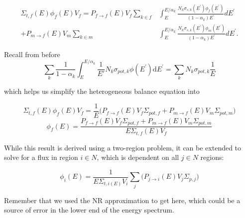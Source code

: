 \documentclass{beamer}
\begin{document}
\begin{frame}
\begin{align*}\Sigma_{t,f}(E)\phi_{f}(E)V_{f} = P_{f\rightarrow f}(E)V_{f}\sum\limits_{k\in f}&\int_{E}^{E/\alpha_{k}}\frac{N_{k}\sigma_{s,k}\left(E^{\prime}\right)\phi_{f}\left(E^{\prime}\right)}{\left(1-\alpha_{k}\right)E^{\prime}}dE^{\prime}  \\
+ P_{m\rightarrow f}(E)V_{m}\sum\limits_{k\in m}&\int_{E}^{E/\alpha_{k}}\frac{N_{k}\sigma_{s,k}\left(E^{\prime}\right)\phi_{m}\left(E^{\prime}\right)}{\left(1-\alpha_{k}\right)E^{\prime}}dE^{\prime}.\end{align*}


Recall from before
  \begin{equation*}{\sum\limits_{k}\frac{1}{1-\alpha_{k}}\int_{E}^{E/\alpha_{k}}\frac{1}{E'}N_{k}\sigma_{pot,k}\phi\left(E^{\prime}\right)\mathrm{d}E^{\prime}=\sum\limits_{k}N_{k}\sigma_{pot,k}\frac{1}{E}}\label{eq:NR-mainConclusion1}\end{equation*}

which helps us simplify the heterogeneous balance equation into

\begin{equation*}\Sigma_{t,f}(E)\phi_{f}(E)V_{f}=\frac{1}{E}\Big(P_{f\rightarrow f}(E)V_{f}\Sigma_{pot,f}+P_{m\rightarrow f}(E)V_{m}\Sigma_{pot,m}\Big)\end{equation*}
\begin{equation*}\phi_{f}(E)=\frac{P_{f\rightarrow f}(E)V_f\Sigma_{pot,f}+P_{m\rightarrow f}(E)V_m\Sigma_{pot,m}}{E\Sigma_{t,f}(E)V_f}\end{equation*}

  \end{frame}
  \begin{frame}
    While this result is derived using a two-region problem, it can be extended to solve for a flux in region $i\in N$, which is dependent on all $j\in N$ regions:

    \begin{equation*}\phi_{i}(E)=\frac{1}{E\Sigma_{t,i(E)}V_i}\sum\limits_j\Big(P_{j\rightarrow i}(E)V_{j}\Sigma_{p,j}\Big)\end{equation*}

  Remember that we used the NR approximation to get here, which could be a source of error in the lower end of the energy spectrum.
  \end{frame}
\end{document}
